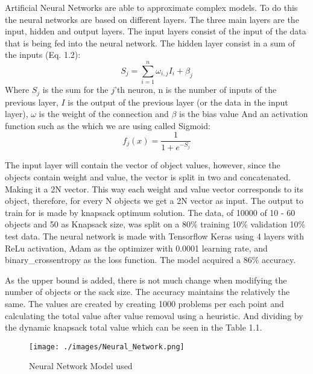 \documentclass{iitthesis}
\begin{document}
 Artificial Neural Networks are able to approximate complex models. To do this the neural networks are based on different layers. The three main layers are the input, hidden and output layers. The input layers consist of the input of the data that is being fed into the neural network. The hidden layer consist in a sum of the inputs (Eq. 1.2):
\begin{equation}
\displaystyle S_{j} = \sum\limits_{i=1}^{n} \omega_{i,j}I_{i}+ \beta_{j}
\end{equation}
Where $S_j$ is the sum for the $j$'th neuron, n is the number of inputs of the previous layer, $I$ is the output of the previous layer (or the data in the input layer), $\omega$ is the weight of the connection and $\beta$ is the bias value
And an activation function such as the which we are using called Sigmoid: 
\begin{equation}
\displaystyle f_{j}(x) = \dfrac{1}{1+e^{-S_j}}
\end{equation}

The input layer will contain the vector of object values, however, since the objects contain weight and value, the vector is split in two and concatenated. Making it a 2N vector.  This way each weight and value vector corresponds to its object\cite{hellstrom1992knapsack}, therefore, for every N objects we get a 2N vector as input. The output to train for is made by knapsack optimum solution. The data, of 10000 of 10 - 60 objects and 50 as Knapsack size, was split on a 80\% training 10\% validation 10\% test data. The neural network is made with Tensorflow Keras using 4 layers with ReLu activation, Adam as the optimizer with 0.0001 learning rate, and binary\_crossentropy as the loss function. The model acquired a 86\% accuracy.

 As the upper bound is added, there is not much change when modifying the number of objects or the sack size. The accuracy maintains the relatively the same. The values are created by creating 1000 problems per each point and calculating the total value after value removal using a heuristic. And dividing by the dynamic knapsack total value which can be seen in the Table 1.1.

\begin{figure}
    \centering
    \texttt{[image: ./images/Neural\_Network.png]}
    \caption{Neural Network Model used}
    \label{fig:trend3}
\end{figure}
\end{document}
